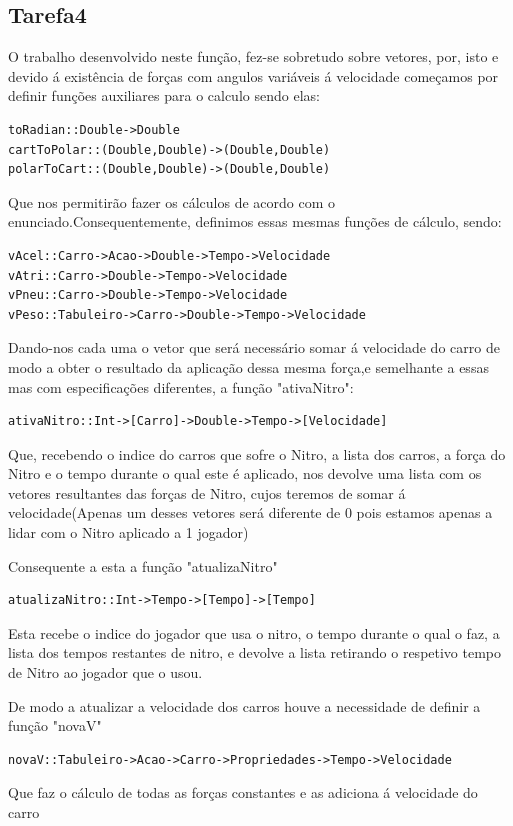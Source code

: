 \documentclass[a4paper]{report} %
\begin{document}
\subsection{Tarefa4}
O trabalho desenvolvido neste função, fez-se sobretudo sobre vetores, por, isto e devido á existência de forças com angulos variáveis á velocidade começamos por definir funções auxiliares para o calculo 
sendo elas:
\begin{verbatim}
toRadian::Double->Double
cartToPolar::(Double,Double)->(Double,Double)
polarToCart::(Double,Double)->(Double,Double)
\end{verbatim}
Que nos permitirão fazer os cálculos de acordo com o enunciado.Consequentemente, definimos essas mesmas funções de cálculo, sendo:
\begin{verbatim}
vAcel::Carro->Acao->Double->Tempo->Velocidade
vAtri::Carro->Double->Tempo->Velocidade
vPneu::Carro->Double->Tempo->Velocidade
vPeso::Tabuleiro->Carro->Double->Tempo->Velocidade
\end{verbatim}
Dando-nos cada uma o vetor que será necessário somar á velocidade do carro de modo a obter o resultado da aplicação dessa mesma força,e semelhante a essas mas com especificações diferentes, a função "ativaNitro":
\begin{verbatim}
ativaNitro::Int->[Carro]->Double->Tempo->[Velocidade]
\end{verbatim}
Que, recebendo o indice do carros que sofre o Nitro, a lista dos carros, a força do Nitro e o tempo durante o qual este é aplicado, nos devolve uma lista com os vetores resultantes das forças de Nitro, cujos teremos de somar á velocidade(Apenas um desses vetores será diferente de 0 pois estamos apenas a lidar com o Nitro aplicado a 1 jogador)

Consequente a esta a função "atualizaNitro"
\begin{verbatim}
atualizaNitro::Int->Tempo->[Tempo]->[Tempo]
\end{verbatim}
Esta recebe o indice do jogador que usa o nitro, o tempo durante o qual o faz, a lista dos tempos restantes de nitro, e devolve a lista retirando o respetivo tempo de Nitro ao jogador que o usou.

De modo a atualizar a velocidade dos carros houve a necessidade de definir a função "novaV"
\begin{verbatim}
novaV::Tabuleiro->Acao->Carro->Propriedades->Tempo->Velocidade
\end{verbatim}
Que faz o cálculo de todas as forças constantes e as adiciona á velocidade do carro
\end{document}
